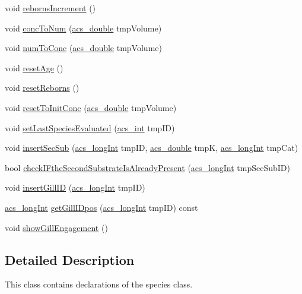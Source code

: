 \begin{DoxyCompactItemize}
\item 
void \hyperlink{a00022_a90d5fc1d90637f2245e8b0ecf228ddfa}{reborns\-Increment} ()
\item 
void \hyperlink{a00022_a9842732a5dbe0eb67e24148b5d7ae4a2}{conc\-To\-Num} (\hyperlink{a00072_ab776853a005fcbf56af0424a2a4dd607}{acs\-\_\-double} tmp\-Volume)
\item 
void \hyperlink{a00022_a23c19a53390142ba690d0f3db0520d05}{num\-To\-Conc} (\hyperlink{a00072_ab776853a005fcbf56af0424a2a4dd607}{acs\-\_\-double} tmp\-Volume)
\item 
void \hyperlink{a00022_a911d4db36e84690d19abb2902a734524}{reset\-Age} ()
\item 
void \hyperlink{a00022_a4884d8bce59ddb79e87e08f3ed16633f}{reset\-Reborns} ()
\item 
void \hyperlink{a00022_acc180a103e6681da2add266aafda3eb9}{reset\-To\-Init\-Conc} (\hyperlink{a00072_ab776853a005fcbf56af0424a2a4dd607}{acs\-\_\-double} tmp\-Volume)
\item 
void \hyperlink{a00022_a8daa007da55f042b9c436f956836f4d8}{set\-Last\-Species\-Evaluated} (\hyperlink{a00072_a8d277355641a098190360234e2ebde35}{acs\-\_\-int} tmp\-I\-D)
\item 
void \hyperlink{a00022_a0da8d53a216583f7790b12362da376a3}{insert\-Sec\-Sub} (\hyperlink{a00072_a19319d75f02db4308bc5c0026d98cd85}{acs\-\_\-long\-Int} tmp\-I\-D, \hyperlink{a00072_ab776853a005fcbf56af0424a2a4dd607}{acs\-\_\-double} tmp\-K, \hyperlink{a00072_a19319d75f02db4308bc5c0026d98cd85}{acs\-\_\-long\-Int} tmp\-Cat)
\item 
bool \hyperlink{a00022_af04a95fb2b35bf988271a60413ec508e}{check\-I\-Fthe\-Second\-Substrate\-Is\-Already\-Present} (\hyperlink{a00072_a19319d75f02db4308bc5c0026d98cd85}{acs\-\_\-long\-Int} tmp\-Sec\-Sub\-I\-D)
\item 
void \hyperlink{a00022_aeca516fc712a2bfa19ec560961ed03f7}{insert\-Gill\-I\-D} (\hyperlink{a00072_a19319d75f02db4308bc5c0026d98cd85}{acs\-\_\-long\-Int} tmp\-I\-D)
\item 
\hyperlink{a00072_a19319d75f02db4308bc5c0026d98cd85}{acs\-\_\-long\-Int} \hyperlink{a00022_a1a5c93a3fd5a2605d5e2fd14d29b97cd}{get\-Gill\-I\-Dpos} (\hyperlink{a00072_a19319d75f02db4308bc5c0026d98cd85}{acs\-\_\-long\-Int} tmp\-I\-D) const 
\item 
void \hyperlink{a00022_a211914e1702d47eb3203730fec2c7b4c}{show\-Gill\-Engagement} ()
\end{DoxyCompactItemize}


\subsection{Detailed Description}
This class contains declarations of the species class. 

